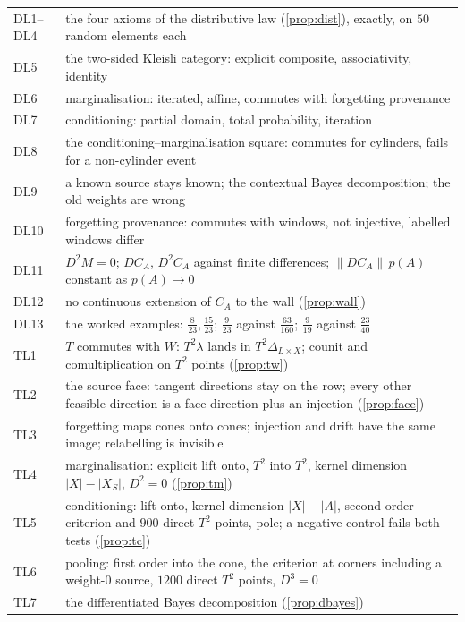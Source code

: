 \documentclass[11pt]{article}
\theoremstyle{definition}\newtheorem{definition}[theorem]{Definition}\newtheorem{remark}[theorem]{Remark}\newtheorem{example}[theorem]{Example}
\begin{document}
\begin{center}\small
\begin{tabular}{lp{}}\toprule
DL1--DL4 & the four axioms of the distributive law (\cref{prop:dist}), exactly, on $50$ random elements each\\
DL5 & the two-sided Kleisli category: explicit composite, associativity, identity\\
DL6 & marginalisation: iterated, affine, commutes with forgetting provenance\\
DL7 & conditioning: partial domain, total probability, iteration\\
DL8 & the conditioning--marginalisation square: commutes for cylinders, fails for a non-cylinder event\\
DL9 & a known source stays known; the contextual Bayes decomposition; the old weights are wrong\\
DL10 & forgetting provenance: commutes with windows, not injective, labelled windows differ\\
DL11 & $D^2M=0$; $DC_A$, $D^2C_A$ against finite differences; $\|DC_A\|\,p(A)$ constant as $p(A)\to0$\\
DL12 & no continuous extension of $C_A$ to the wall (\cref{prop:wall})\\
DL13 & the worked examples: $\tfrac8{23},\tfrac{15}{23}$; $\tfrac9{23}$ against $\tfrac{63}{160}$; $\tfrac9{19}$ against $\tfrac{23}{40}$\\\midrule
TL1 & $T$ commutes with $W$: $T^2\lambda$ lands in $T^2\Delta_{L\times X}$; counit and comultiplication on $T^2$ points (\cref{prop:tw})\\
TL2 & the source face: tangent directions stay on the row; every other feasible direction is a face direction plus an injection (\cref{prop:face})\\
TL3 & forgetting maps cones onto cones; injection and drift have the same image; relabelling is invisible\\
TL4 & marginalisation: explicit lift onto, $T^2$ into $T^2$, kernel dimension $|X|-|X_S|$, $D^2=0$ (\cref{prop:tm})\\
TL5 & conditioning: lift onto, kernel dimension $|X|-|A|$, second-order criterion and $900$ direct $T^2$ points, pole; a negative control fails both tests (\cref{prop:tc})\\
TL6 & pooling: first order into the cone, the criterion at corners including a weight-$0$ source, $1200$ direct $T^2$ points, $D^3=0$\\
TL7 & the differentiated Bayes decomposition (\cref{prop:dbayes})\\

\end{tabular}
\end{center}
\end{document}
